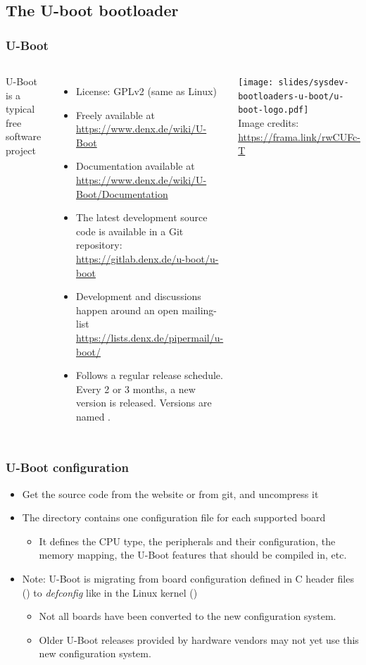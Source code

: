 \subsection{The U-boot bootloader}

\begin{frame}
  \frametitle{U-Boot}
  \begin{columns}
      U-Boot is a typical free software project
      \begin{itemize}
      \item License: GPLv2 (same as Linux)
      \item Freely available at \url{https://www.denx.de/wiki/U-Boot}
      \item Documentation available at
        \url{https://www.denx.de/wiki/U-Boot/Documentation}
      \item The latest development source code is available in a Git
        repository:
        \url{https://gitlab.denx.de/u-boot/u-boot}
      \item Development and discussions happen around an open mailing-list
        \url{https://lists.denx.de/pipermail/u-boot/}
      \item Follows a regular release schedule. Every 2 or 3 months,
        a new version is released. Versions are named .
      \end{itemize}
      \texttt{[image: slides/sysdev-bootloaders-u-boot/u-boot-logo.pdf]}\\
      \tiny Image credits: \url{https://frama.link/rwCUFc-T}
  \end{columns}
\end{frame}

\begin{frame}
  \frametitle{U-Boot configuration}
  \begin{itemize}
  \item Get the source code from the website or from git, and uncompress it
  \item The  directory contains one configuration file
    for each supported board
    \begin{itemize}
    \item It defines the CPU type, the peripherals and their configuration, the
      memory mapping, the U-Boot features that should be compiled in, etc.
    \end{itemize}
  \item Note: U-Boot is migrating from board configuration defined in
    C header files () to {\em defconfig} like in
    the Linux kernel ()
    \begin{itemize}
    \item Not all boards have been converted to the new configuration
      system.
    \item Older U-Boot releases provided by hardware vendors may not
      yet use this new configuration system.
    \end{itemize}
  \end{itemize}
\end{frame}

